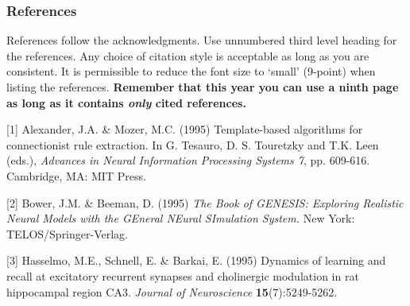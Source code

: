 \documentclass{article} %
\begin{document}
\subsubsection*{References}

References follow the acknowledgments. Use unnumbered third level heading for
the references. Any choice of citation style is acceptable as long as you are
consistent. It is permissible to reduce the font size to `small' (9-point) 
when listing the references. {\bf Remember that this year you can use
a ninth page as long as it contains \emph{only} cited references.}

\small{
[1] Alexander, J.A. \& Mozer, M.C. (1995) Template-based algorithms
for connectionist rule extraction. In G. Tesauro, D. S. Touretzky
and T.K. Leen (eds.), {\it Advances in Neural Information Processing
Systems 7}, pp. 609-616. Cambridge, MA: MIT Press.

[2] Bower, J.M. \& Beeman, D. (1995) {\it The Book of GENESIS: Exploring
Realistic Neural Models with the GEneral NEural SImulation System.}
New York: TELOS/Springer-Verlag.

[3] Hasselmo, M.E., Schnell, E. \& Barkai, E. (1995) Dynamics of learning
and recall at excitatory recurrent synapses and cholinergic modulation
in rat hippocampal region CA3. {\it Journal of Neuroscience}
{\bf 15}(7):5249-5262.
}
\end{document}
